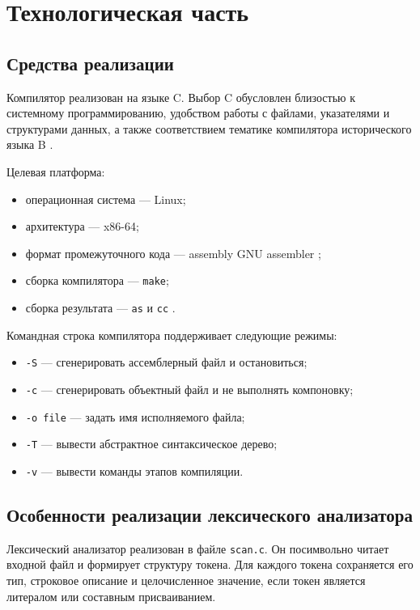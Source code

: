 \chapter{Технологическая часть}

\section{Средства реализации}

Компилятор реализован на языке C. Выбор C обусловлен близостью к системному программированию, удобством работы с файлами, указателями и структурами данных, а также соответствием тематике компилятора исторического языка B \cite{kandr}.

Целевая платформа:

\begin{itemize}
  \item операционная система --- Linux;
  \item архитектура --- x86-64;
  \item формат промежуточного кода --- assembly GNU assembler \cite{gas};
  \item сборка компилятора --- \texttt{make};
  \item сборка результата --- \texttt{as} и \texttt{cc} \cite{gcc}.
\end{itemize}

Командная строка компилятора поддерживает следующие режимы:

\begin{itemize}
  \item \texttt{-S} --- сгенерировать ассемблерный файл и остановиться;
  \item \texttt{-c} --- сгенерировать объектный файл и не выполнять компоновку;
  \item \texttt{-o file} --- задать имя исполняемого файла;
  \item \texttt{-T} --- вывести абстрактное синтаксическое дерево;
  \item \texttt{-v} --- вывести команды этапов компиляции.
\end{itemize}

\section{Особенности реализации лексического анализатора}

Лексический анализатор реализован в файле \texttt{scan.c}. Он посимвольно читает входной файл и формирует структуру токена. Для каждого токена сохраняется его тип, строковое описание и целочисленное значение, если токен является литералом или составным присваиванием.

